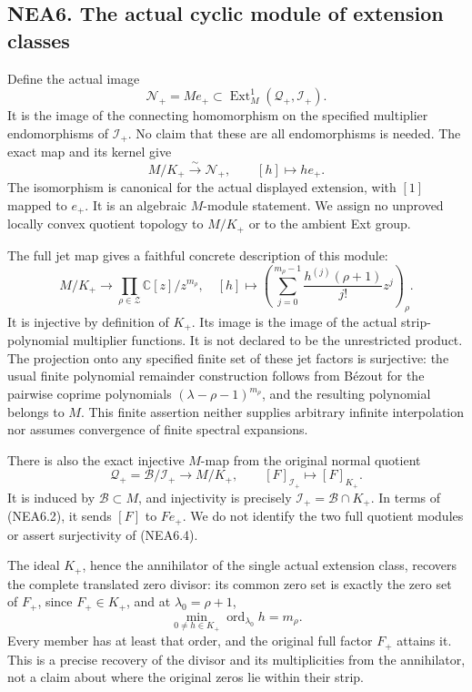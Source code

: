 \subsection{NEA6. The actual cyclic module of extension
classes}\label{nea6.-the-actual-cyclic-module-of-extension-classes}

Define the actual image \[
\mathscr N_+=M e_+\subset\operatorname{Ext}^1_M(\mathcal Q_+,\mathcal I_+).
\tag{NEA6.1}
\] It is the image of the connecting homomorphism on the specified
multiplier endomorphisms of \(\mathcal I_+\). No claim that these are
all endomorphisms is needed. The exact map and its kernel give \[
M/K_+\xrightarrow{\sim}\mathscr N_+,
\qquad [h]\longmapsto h e_+.
\tag{NEA6.2}
\] The isomorphism is canonical for the actual displayed extension, with
\([1]\) mapped to \(e_+\). It is an algebraic \(M\)-module statement. We
assign no unproved locally convex quotient topology to \(M/K_+\) or to
the ambient Ext group.

The full jet map gives a faithful concrete description of this module:
\[
M/K_+\longrightarrow\prod_{\rho\in\mathscr Z}\mathbb C[z]/z^{m_\rho},
\quad [h]\longmapsto
\left(\sum_{j=0}^{m_\rho-1}\frac{h^{(j)}(\rho+1)}{j!}z^j\right)_\rho.
\tag{NEA6.3}
\] It is injective by definition of \(K_+\). Its image is the image of
the actual strip-polynomial multiplier functions. It is not declared to
be the unrestricted product. The projection onto any specified finite
set of these jet factors is surjective: the usual finite polynomial
remainder construction follows from Bézout for the pairwise coprime
polynomials \((\lambda-\rho-1)^{m_\rho}\), and the resulting polynomial
belongs to \(M\). This finite assertion neither supplies arbitrary
infinite interpolation nor assumes convergence of finite spectral
expansions.

There is also the exact injective \(M\)-map from the original normal
quotient \[
\mathcal Q_+=\mathcal B/\mathcal I_+\longrightarrow M/K_+,
\qquad [F]_{\mathcal I_+}\longmapsto[F]_{K_+}.
\tag{NEA6.4}
\] It is induced by \(\mathcal B\subset M\), and injectivity is
precisely \(\mathcal I_+=\mathcal B\cap K_+\). In terms of (NEA6.2), it
sends \([F]\) to \(F e_+\). We do not identify the two full quotient
modules or assert surjectivity of (NEA6.4).

The ideal \(K_+\), hence the annihilator of the single actual extension
class, recovers the complete translated zero divisor: its common zero
set is exactly the zero set of \(F_+\), since \(F_+\in K_+\), and at
\(\lambda_0=\rho+1\), \[
\min_{0\ne h\in K_+}\operatorname{ord}_{\lambda_0}h=m_\rho.
\tag{NEA6.5}
\] Every member has at least that order, and the original full factor
\(F_+\) attains it. This is a precise recovery of the divisor and its
multiplicities from the annihilator, not a claim about where the
original zeros lie within their strip.

